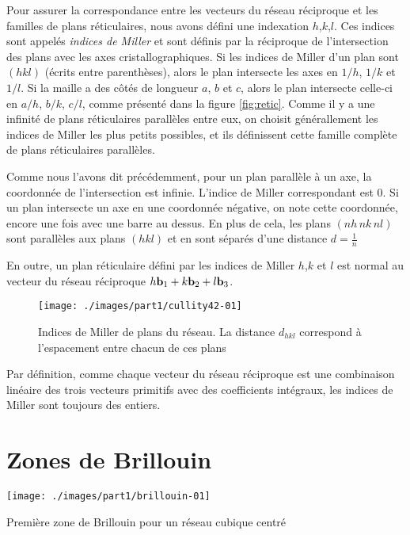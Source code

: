 Pour assurer la correspondance entre les vecteurs du réseau réciproque et les familles de plans réticulaires, nous avons défini une indexation $h$,$k$,$l$. Ces indices sont appelés \emph{indices de Miller} et sont définis par la réciproque de l'intersection des plans avec les axes cristallographiques. Si les indices de Miller d'un plan sont $(hkl)$ (écrits entre parenthèses), alors le plan intersecte les axes en $1/h$, $1/k$ et $1/l$. Si la maille a des côtés de longueur $a$, $b$ et $c$, alors le plan intersecte celle-ci en $a/h$, $b/k$, $c/l$, comme présenté dans la figure \ref{fig:retic}. Comme il y a une infinité de plans réticulaires parallèles entre eux, on choisit générallement les indices de Miller les plus petits possibles, et ils définissent cette famille complète de plans réticulaires parallèles.

Comme nous l'avons dit précédemment, pour un plan parallèle à un axe, la coordonnée de l'intersection est infinie. L'indice de Miller correspondant est $0$. Si un plan intersecte un axe en une coordonnée négative, on note cette coordonnée, encore une fois avec une barre au dessus.
En plus de cela, les plans $(nh\,nk\,nl)$ sont parallèles aux plans $(hkl)$ et en sont séparés d'une distance $d = \frac{1}{n}$

En outre, un plan réticulaire défini par les indices de Miller $h$,$k$ et $l$ est normal au vecteur du réseau réciproque $h\mathbf{b}_1 + k \mathbf{b}_2 + l\mathbf{b}_3$.

\begin{figure}
    \texttt{[image: ./images/part1/cullity42-01]}
    \caption{Indices de Miller de plans du réseau. La distance $d_{hkl}$
    correspond à l'espacement entre chacun de ces plans}
    \label{fig:miller}
\end{figure}

Par définition, comme chaque vecteur du réseau réciproque est une combinaison linéaire des trois vecteurs primitifs avec des coefficients intégraux, les indices de Miller sont toujours des entiers.



\section{Zones de Brillouin}

\begin{marginfigure}
\texttt{[image: ./images/part1/brillouin-01]}
\caption{Première zone de Brillouin pour un réseau cubique centré}
\label{fig:brillouinbcc}
\end{marginfigure}

